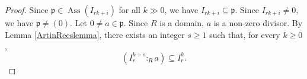 \documentclass[11pt,reqno,a4paper]{amsart}
\theoremstyle{definition}
\begin{document}
\begin{proof}

Since $\mathfrak{p}\in\operatorname{Ass}(I_{rk+i})$ for all $k\gg 0$, we have $I_{rk+i}\subseteq\mathfrak{p}$. Since $I_{rk+i}\neq 0$, we have $\mathfrak{p}\neq (0)$. Let $0\neq a\in\mathfrak{p}$. Since $R$ is a domain, $a$ is a non-zero divisor. By Lemma \ref{ArtinReeslemma}, there exists an integer $s\geq 1$ such that, for every $k\geq 0$,
\[
(I_r^{k+s}:_R a)\subseteq I_r^k.
\]


\end{proof}
\end{document}
